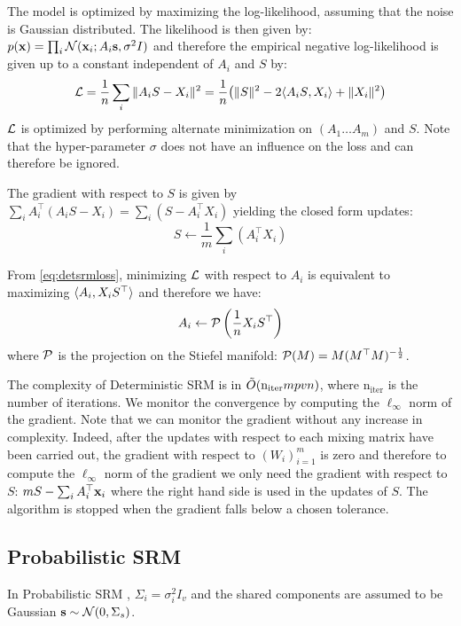 \documentclass{article}
\begin{document}
The model is optimized by maximizing the log-likelihood, assuming that
the noise is Gaussian distributed.
%
The likelihood is then given by: $p(\mathbf{x}) = \prod_i \mathcal{N}(\mathbf{x}_i; A_i \mathbf{s}, \sigma^2 I)$ and
therefore the empirical
%
%
negative log-likelihood is given up to a constant independent of
$A_i$ and $S$ by:
\begin{align}
  \mathcal{L} = \frac1{n} \sum_i \|A_i S - X_i \|^2 = \frac1{n} \big(\| S \|^2 -2 \langle{ A_i S},{ X_i }\rangle + \| X_i \|^2 \big)
  \label{eq:detsrmloss}
\end{align}
$\mathcal{L}$ is optimized by performing alternate minimization on $(A_1 \dots A_m)$
and $S$.
%
Note that the hyper-parameter $\sigma$ does not have an influence on
the loss and can therefore be ignored.



The gradient with respect to $S$ is given by $\sum_i A_i^{\top}(A_i S -
X_i) = \sum_i (S - A_i^{\top} X_i)$
yielding the closed form updates:
\begin{equation}
  S \leftarrow  \frac1m \sum_i (A_i^{\top} X_i)
  \label{eq:srm:supdate}
\end{equation}

From \eqref{eq:detsrmloss}, minimizing $\mathcal{L}$ with respect to $A_i$ is
equivalent to maximizing $\langle{ A_i},{ X_i S^{\top} }\rangle$ and therefore we
have:
\begin{equation}
  A_i \leftarrow  \mathcal{P} \left(\frac1{n}X_i S^{\top} \right)
  \label{eq:detsrm:Aiupdate}
\end{equation}
where $\mathcal{P}$ is the projection on the Stiefel manifold: $\mathcal{P}(M) = M
(M^{\top}M)^{-\frac12}$.
%


The complexity of Deterministic SRM is in $\tilde{O}(\mathrm{n_{iter}} mpvn)$, where
 $\mathrm{n_{iter}}$ is the number of iterations.
%
We monitor the convergence by computing the $\ell_{\infty}$ norm of the
gradient.
%
Note that we can monitor the gradient without any increase in complexity.
%
Indeed, after the updates with respect to each mixing matrix have been
carried out, the gradient with respect to $(W_i)_{i=1}^m$ is zero and therefore
to compute the $\ell_{\infty}$ norm of the gradient we only need the gradient
with respect to $S$: $m S - \sum_i A_i^{\top}\mathbf{x}_i$ where the right hand side is
used in the updates of $S$.
%
The algorithm is stopped when the
gradient falls below a chosen tolerance.
%


\subsection{Probabilistic SRM}
\label{sec:probabilisticsrm}
In Probabilistic SRM , $\Sigma_i=\sigma_i^2 I_v$ and the shared
components are assumed to be Gaussian $\mathbf{s} \sim \mathcal{N}(0, \Sigma_s)$.
%
\end{document}
